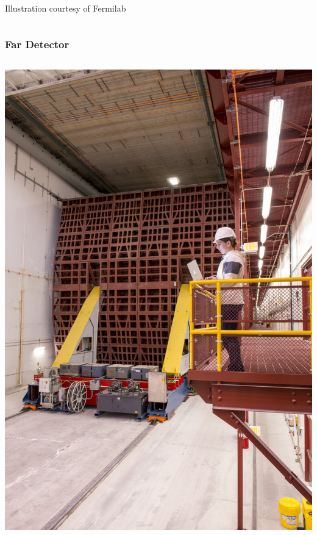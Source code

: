 \documentclass[10pt,professionalfonts,xcolor=table]{beamer}
\begin{document}
{\begin{columns}[c]
 {\scriptsize Illustration courtesy of Fermilab}

\end{columns}




}




\frame
{
  \frametitle{Far Detector}
  \centering
\begin{columns}[c]
\centering
 \includegraphics[height=0.85\textheight]{figures/det_photos/det_front.jpg}


\end{columns}}
\end{document}
